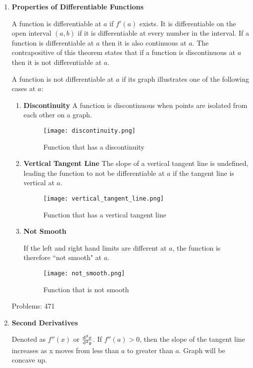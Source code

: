 \documentclass{article}
\begin{document}
\begin{enumerate}

\item \textbf{Properties of Differentiable Functions}

A function is differentiable at $a$ if $f'(a)$ exists. It is differentiable on the open interval $(a, b)$ if it is differentiable at every number in the interval. If a function is differentiable at $a$ then it is also continuous at $a$. The contrapositive of this theorem states that if a function is discontinuous at $a$ then it is not differentiable at $a$.

A function is not differentiable at $a$ if its graph illustrates one of the following cases at $a$:

\begin{enumerate}
    \item \textbf{Discontinuity}
    A function is discontinuous when points are isolated from each other on a graph.
    \begin{figure}[h]
        \centering
        \texttt{[image: discontinuity.png]}
        \caption{Function that has a discontinuity}
    \end{figure}
    
    \item \textbf{Vertical Tangent Line}
    The slope of a vertical tangent line is undefined, leading the function to not be differentiable at $a$ if the tangent line is vertical at $a$. 
    \begin{figure}[h]
        \centering
        \texttt{[image: vertical\_tangent\_line.png]}
        \caption{Function that has a vertical tangent line}
    \end{figure}
    
    \item \textbf{Not Smooth}

    If the left and right hand limits are different at $a$, the function is therefore ``not smooth" at $a$. 
    \begin{figure}[h]
        \centering
        \texttt{[image: not\_smooth.png]}
        \caption{Function that is not smooth}
    \end{figure}
\end{enumerate}

Problems: 471

\item \textbf{Second Derivatives}

Denoted as $f''(x)$ or $\frac{\odif[order={2}]{x}}{\odif[order={2}]{y}}$. 
If $f''(a) > 0$, then the slope of the tangent line increases as x moves from less than $a$ to greater than $a$. Graph will be concave up.


\end{enumerate}
\end{document}
